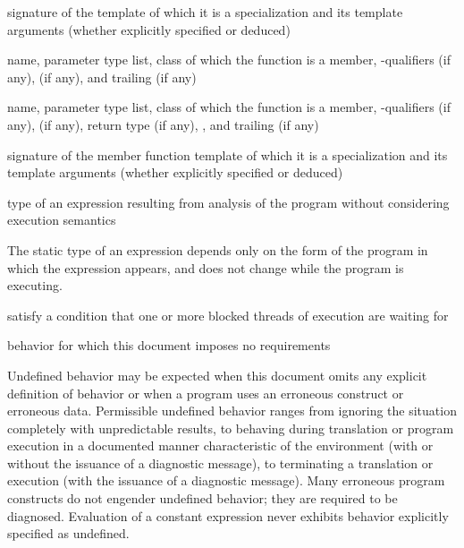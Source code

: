 %
 signature of the template of which it is a specialization
and its template arguments (whether explicitly specified or deduced)

%
name,
parameter type list,
class of which the function is a member,
\cv-qualifiers (if any),
 (if any),
and
trailing  (if any)

%
name,
parameter type list,
class of which the function is a member,
\cv-qualifiers (if any),
 (if any),
return type (if any),
,
and
trailing  (if any)

%
 signature of the member function template
of which it is a specialization and its template arguments (whether explicitly specified or deduced)

%
type of an expression resulting from
analysis of the program without considering execution semantics

\begin{defnote}
The static type of an expression depends only on the form of the program in
which the expression appears, and does not change while the program is
executing.
\end{defnote}

%
satisfy a condition that one or more blocked threads of execution are waiting for

%
behavior for which this document
imposes no requirements

\begin{defnote}
Undefined behavior may be expected when
this document omits any explicit
definition of behavior or when a program uses an erroneous construct or erroneous data.
Permissible undefined behavior ranges
from ignoring the situation completely with unpredictable results, to
behaving during translation or program execution in a documented manner
characteristic of the environment (with or without the issuance of a
diagnostic message), to terminating a translation or execution (with the
issuance of a diagnostic message). Many erroneous program constructs do
not engender undefined behavior; they are required to be diagnosed.
Evaluation of a constant expression never exhibits behavior explicitly
specified as undefined.
\end{defnote}

